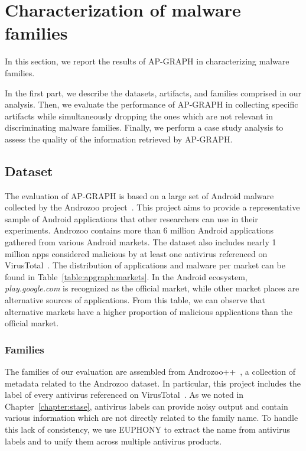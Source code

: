 \section{Characterization of malware families}
In this section, we report the results of AP-GRAPH in characterizing malware families.

In the first part, we describe the datasets, artifacts, and families comprised in our analysis.
Then, we evaluate the performance of AP-GRAPH in collecting specific artifacts while simultaneously dropping the ones which are not relevant in discriminating malware families.
Finally, we perform a case study analysis to assess the quality of the information retrieved by AP-GRAPH.
\subsection{Dataset}



The evaluation of AP-GRAPH is based on a large set of Android malware collected by the Androzoo project~\cite{allix_androzoo:_2016}.
This project aims to provide a representative sample of Android applications that other researchers can use in their experiments.
Androzoo contains more than 6 million Android applications gathered from various Android markets.
The dataset also includes nearly 1 million apps considered malicious by at least one antivirus referenced on VirusTotal~\cite{noauthor_virustotal_nodate}.
The distribution of applications and malware per market can be found in Table~\ref{table:apgraph:markets}.
In the Android ecosystem, \textit{play.google.com} is recognized as the official market, while other market places are alternative sources of applications.
From this table, we can observe that alternative markets have a higher proportion of malicious applications than the official market.
\subsubsection{Families}
The families of our evaluation are assembled from Androzoo++~\cite{li_androzoo++:_2017}, a collection of metadata related to the Androzoo dataset.
In particular, this project includes the label of every antivirus referenced on VirusTotal~\cite{noauthor_virustotal_nodate}.
As we noted in Chapter~\ref{chapter:stase}, antivirus labels can provide noisy output and contain various information which are not directly related to the family name.
To handle this lack of consistency, we use EUPHONY to extract the name from antivirus labels and to unify them across multiple antivirus products.

